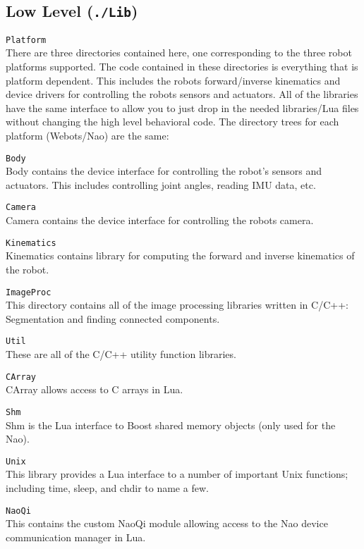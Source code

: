 \documentclass{article}
\begin{document}
  \subsection{Low Level (\texttt{./Lib})}

    \begin{description}

      \item \texttt{Platform} \\ 
        There are three directories contained here, one corresponding to the three robot platforms supported. The code contained in these directories is everything that is platform dependent. This includes the robots forward/inverse kinematics and device drivers for controlling the robots sensors and actuators. All of the libraries have the same interface to allow you to just drop in the needed libraries/Lua files without changing the high level behavioral code. The directory trees for each platform (Webots/Nao) are the same:

      \begin{description}
        \item \texttt{Body} \\
          Body contains the device interface for controlling the robot's sensors and actuators. This includes controlling joint angles, reading IMU data, etc. 
        \item \texttt{Camera} \\
          Camera contains the device interface for controlling the robots camera.
        \item \texttt{Kinematics} \\ 
          Kinematics contains library for computing the forward and inverse kinematics of the robot.
      \end{description}
      \item \texttt{ImageProc} \\
        This directory contains all of the image processing libraries written in C/C++: Segmentation and finding connected components.
      \item \texttt{Util} \\
        These are all of the C/C++ utility function libraries. 
      \begin{description}
        \item \texttt{CArray} \\
          CArray allows access to C arrays in Lua.
        \item \texttt{Shm} \\
          Shm is the Lua interface to Boost shared memory objects (only used for the Nao).
        \item \texttt{Unix} \\
          This library provides a Lua interface to a number of important Unix functions; including time, sleep, and chdir to name a few. 
        \item \texttt{NaoQi} \\
          This contains the custom NaoQi module allowing access to the Nao device communication manager in Lua.
      \end{description}
    \end{description}
\end{document}
